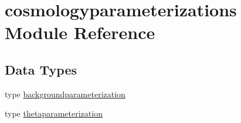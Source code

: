 \hypertarget{namespacecosmologyparameterizations}{}\section{cosmologyparameterizations Module Reference}
\label{namespacecosmologyparameterizations}
\subsection*{Data Types}
\begin{DoxyCompactItemize}
\item 
type \mbox{\hyperlink{structcosmologyparameterizations_1_1backgroundparameterization}{backgroundparameterization}}
\item 
type \mbox{\hyperlink{structcosmologyparameterizations_1_1thetaparameterization}{thetaparameterization}}
\end{DoxyCompactItemize}
